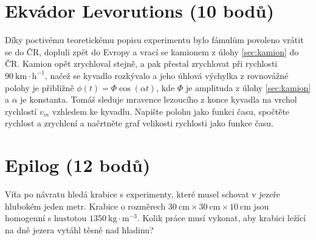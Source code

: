 \documentclass[10pt,a4paper,landscape]{article}
\begin{document}
\begin{multicols}{2}[]
\section{Ekvádor Levorutions (10 bodů)}
Díky poctivému teoretickému popisu experimentu bylo fámulům povoleno vrátit se do ČR, dopluli zpět do Evropy a vrací se kamionem z úlohy \ref{sec:kamion} do ČR. Kamion opět zrychloval stejně, a pak přestal zrychlovat při rychlosti $90~\mathrm{km}\cdot\mathrm{h}^{-1}$, načež se kyvadlo rozkývalo a jeho úhlová výchylka z rovnovážné polohy je přibližně $\phi\left(t\right) = \Phi\cos\left(\alpha t\right)$,
kde $\Phi$ je amplituda z úlohy \ref{sec:kamion} a $\alpha$ je konstanta. Tomáš sleduje mravence lezoucího z konce kyvadla na vrchol rychlostí $v_m$ vzhledem ke kyvadlu. Napište polohu jako funkci času, spočtěte rychlost a zrychlení a načrtněte graf velikosti rychlosti jako funkce času.

\section{Epilog (12 bodů)}
Víťa po návratu hledá krabice s experimenty, které musel schovat v jezeře hlubokém jeden metr. Krabice o rozměrech $30~\mathrm{cm}\times 30~\mathrm{cm}\times 10~\mathrm{cm}$ jsou homogenní s hustotou $1350~\mathrm{kg}\cdot\mathrm{m}^{-3}$. Kolik práce musí vykonat, aby krabici ležící na dně jezera vytáhl těsně nad hladinu?


%
%


\end{multicols}
\end{document}
